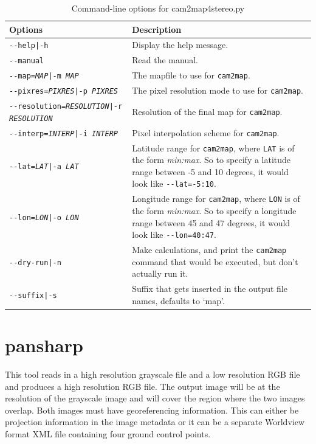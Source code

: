 \begin{longtable}{|l|p{10cm}|}
\caption{Command-line options for cam2map4stereo.py}
\label{tbl:bundlevis}
\endfirsthead
\endhead
\endfoot
\endlastfoot
\hline
Options & Description \\ \hline \hline
\texttt{-\/-help|-h} & Display the help message. \\ \hline
\texttt{-\/-manual} & Read the manual. \\ \hline
\texttt{-\/-map=\textit{MAP}|-m \textit{MAP}} & The mapfile to use for \texttt{cam2map}. \\ \hline
\texttt{-\/-pixres=\textit{PIXRES}|-p \textit{PIXRES}} & The pixel resolution mode to use for \texttt{cam2map}. \\ \hline
\texttt{-\/-resolution=\textit{RESOLUTION}|-r \textit{RESOLUTION}} & Resolution of the final map for \texttt{cam2map}. \\ \hline
\texttt{-\/-interp=\textit{INTERP}|-i \textit{INTERP}} & Pixel interpolation scheme for \texttt{cam2map}. \\ \hline
\texttt{-\/-lat=\textit{LAT}|-a \textit{LAT}} & Latitude range for \texttt{cam2map}, where \texttt{LAT} is of the form \textit{min:max}.  So to specify a latitude range between -5 and 10 degrees, it would look like \texttt{-\/-lat=-5:10}. \\ \hline
\texttt{-\/-lon=\textit{LON}|-o \textit{LON}} & Longitude range for \texttt{cam2map}, where \texttt{LON} is of the form \textit{min:max}.  So to specify a longitude range between 45 and 47 degrees, it would look like \texttt{-\/-lon=40:47}. \\ \hline
\texttt{-\/-dry-run|-n} & Make calculations, and print the \texttt{cam2map} command that would be executed, but don't actually run it.\\ \hline
\texttt{-\/-suffix|-s} & Suffix that gets inserted in the output file names, defaults to `map'.\\ \hline
\end{longtable}

\clearpage



\section{pansharp}
\label{pansharp}

This tool reads in a high resolution grayscale file and a low resolution RGB file and produces
a high resolution RGB file.  The output image will be at the resolution of the grayscale image
and will cover the region where the two images overlap.  Both images must have georeferencing
information.  This can either be projection information in the image metadata or it can be a
separate Worldview format XML file containing four ground control points.


